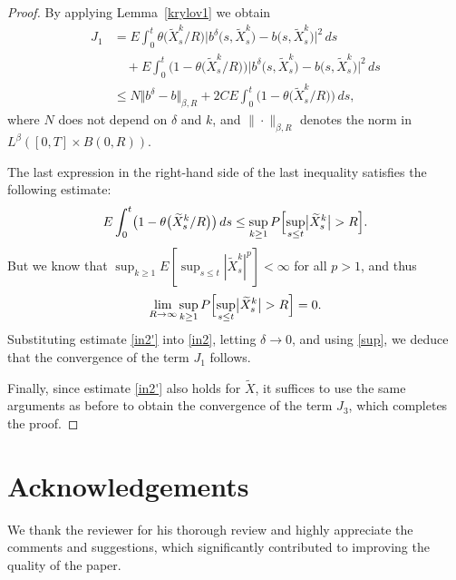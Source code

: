 \documentclass[numbers,compress,v1.0.1]{vmsta}
\theoremstyle{definition}
\def\Sup{\displaystyle\sup}
\def\Lim{\displaystyle\lim}
\newcommand{\rrVert}{\Vert}
\newcommand{\llVert}{\Vert}
\begin{document}
\begin{proof}
By applying Lemma~\ref{krylov1} we obtain
%
\begin{align}
\label{in2} J_1 &= E\int_{0}^{t}\theta\bigl(\widetilde{X}^{k}_{s}/R\bigr) \bigl| b^{\delta}\bigl(s,\widetilde {X}^{k}_{s}\bigr) - b\bigl(s,\widetilde{X}^{k}_{s}\bigr) \bigr|^2 \,ds\nonumber\\
&\quad + E\int_{0}^{t} \bigl(1 - \theta\bigl(\widetilde{X}^{k}_{s}/R\bigr) \bigr) \bigl|b^{\delta}\bigl(s,\widetilde{X}^{k}_{s}\bigr)-b\bigl(s,\widetilde{X}^{k}_{s}\bigr) \bigr|^2 \,ds\nonumber\\
&\leq N \bigl\llVert b^{\delta}- b \bigr\rrVert _{\beta,R}+2CE\int_{0}^{t} \bigl(1-\theta\bigl(\widetilde{X}^{k}_{s}/R\bigr) \bigr)\,ds,
\end{align}
%
where $N$ does not depend on $\delta$ and $k$, and $\|\cdot\|_{\beta
,R}$ denotes the norm in
$L^{\beta}([0,T]\times B(0,R))$.

The last expression in the right-hand side of the last inequality
satisfies the following estimate:
%
\begin{equation}
\label{in2'} E\int_{0}^{t} \bigl(1 - \theta\bigl(\widetilde{X}^{k}_{s}/R\bigr) \bigr)\,ds \leq
\Sup_{k\geq1} P \Bigl[\Sup_{s\leq t}\bigl|\widetilde{X}^{k}_{s}\bigr|>R\Bigr].
\end{equation}
%
But we know that $\sup_{k\geq1} E [\sup_{s\leq t}|\widetilde
{X}^{k}_{s}|^{p} ] < \infty$ for all $p>1$, and thus
%
\begin{equation}
\label{sup} \Lim_{R \rightarrow\infty}\Sup_{k\geq1} P
\Bigl[\Sup_{s\leq t}\bigl|\widetilde{X}^{k}_{s}\bigr|>R \Bigr] = 0.
\end{equation}
%
Substituting estimate \eqref{in2'} into \eqref{in2}, letting $\delta
\rightarrow0$, and using \eqref{sup}, we deduce that the convergence
of the term $J_1$ follows.

Finally, since estimate \eqref{in2'} also holds for $\widetilde X$, it
suffices to use the same arguments as before to obtain the convergence
of the term $J_3$, which completes the proof.
\end{proof}
%
\section*{Acknowledgements} We thank the reviewer for his thorough
review and highly appreciate the comments and
suggestions, which significantly contributed to improving the quality
of the paper.

%
%
%
\end{document}
